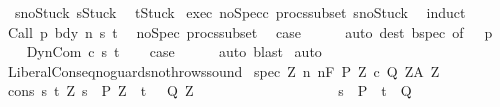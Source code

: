 \begin{isabellebody}
\ \ s{\isacharunderscore}no{\isacharunderscore}Stuck{\isacharcolon}\ {\isachardoublequoteopen}s{\isasymnoteq}Stuck{\isachardoublequoteclose}\isanewline
\ \ {\isachardoublequoteopen}t{\isasymnoteq}Stuck{\isachardoublequoteclose}\isanewline
%
\isadelimproof
%
\endisadelimproof
%
\isatagproof
{}\isamarkupfalse%
\ exec\ noSpec{\isacharunderscore}c\ procs{\isacharunderscore}subset\ s{\isacharunderscore}no{\isacharunderscore}Stuck\ \isamarkupfalse%
\ induct\isanewline
\ \ \isamarkupfalse%
\ {\isacharparenleft}Call\ p\ bdy\ n\ s\ t{\isacharparenright}\ \isamarkupfalse%
\ noSpec{\isacharunderscore}{\isasymGamma}\ procs{\isacharunderscore}subset{\isacharunderscore}{\isasymGamma}\ \isamarkupfalse%
\ {\isacharquery}case\isanewline
\ \ \ \ \isamarkupfalse%
\ {\isacharparenleft}auto\ dest{\isacharbang}{\isacharcolon}\ bspec\ {\isacharbrackleft}of\ {\isacharunderscore}\ {\isacharunderscore}\ p{\isacharbrackright}{\isacharparenright}\isanewline
{}\isamarkupfalse%
\isanewline
\ \ \isamarkupfalse%
\ {\isacharparenleft}DynCom\ c\ s\ t{\isacharparenright}\ \isamarkupfalse%
\ \isamarkupfalse%
\ {\isacharquery}case\isanewline
\ \ \ \ \isamarkupfalse%
\ auto\ blast\isanewline
{}\isamarkupfalse%
\ auto%
\endisatagproof
{\isafoldproof}%
%
\isadelimproof
\isanewline
%
\endisadelimproof
\isanewline
{}\isamarkupfalse%
\ LiberalConseq{\isacharunderscore}noguards{\isacharunderscore}nothrows{\isacharunderscore}sound{\isacharcolon}\isanewline
{}\ spec{\isacharcolon}\ {\isachardoublequoteopen}{\isasymforall}Z{\isachardot}\ {\isasymforall}n{\isachardot}\ {\isasymGamma}{\isacharcomma}{\isasymTheta}{\isasymTurnstile}n{\isacharcolon}\isactrlbsub {\isacharslash}F\isactrlesub \ {\isacharparenleft}P{\isacharprime}\ Z{\isacharparenright}\ c\ {\isacharparenleft}Q{\isacharprime}\ Z{\isacharparenright}{\isacharcomma}{\isacharparenleft}A{\isacharprime}\ Z{\isacharparenright}{\isachardoublequoteclose}\isanewline
{}\ cons{\isacharcolon}\ {\isachardoublequoteopen}{\isasymforall}s\ t{\isachardot}\ {\isacharparenleft}{\isasymforall}Z{\isachardot}\ s\ {\isasymin}\ P{\isacharprime}\ Z\ {\isasymlongrightarrow}\ t\ {\isasymin}\ \ Q{\isacharprime}\ Z\ {\isacharparenright}\isanewline
\ \ \ \ \ \ \ \ \ \ \ \ \ \ \ \ \ \ {\isasymlongrightarrow}\ {\isacharparenleft}s\ {\isasymin}\ P\ {\isasymlongrightarrow}\ t\ {\isasymin}\ Q\ {\isacharparenright}{\isachardoublequoteclose}\isanewline

\end{isabellebody}
